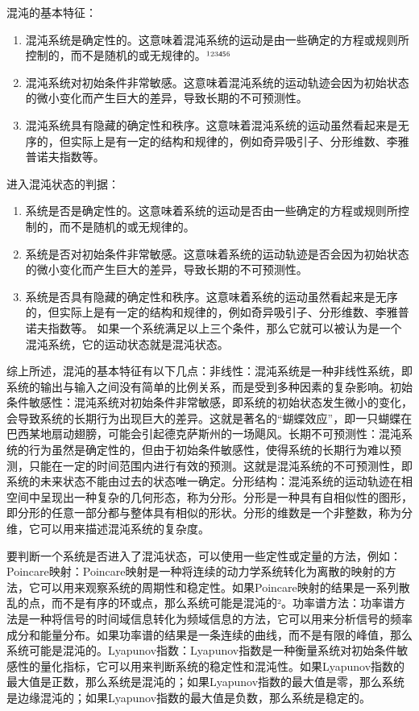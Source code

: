 \documentclass[dvipsnames, svgnames,a4paper,11pt]{article}
\begin{document}
	混沌的基本特征：
	\begin{enumerate}
		\item 混沌系统是确定性的。这意味着混沌系统的运动是由一些确定的方程或规则所控制的，而不是随机的或无规律的。¹²³⁴⁵⁶
		\item 混沌系统对初始条件非常敏感。这意味着混沌系统的运动轨迹会因为初始状态的微小变化而产生巨大的差异，导致长期的不可预测性。
		\item 混沌系统具有隐藏的确定性和秩序。这意味着混沌系统的运动虽然看起来是无序的，但实际上是有一定的结构和规律的，例如奇异吸引子、分形维数、李雅普诺夫指数等。
	\end{enumerate}
	
	进入混沌状态的判据：
	\begin{enumerate}
		\item 系统是否是确定性的。这意味着系统的运动是否由一些确定的方程或规则所控制的，而不是随机的或无规律的。
		\item 系统是否对初始条件非常敏感。这意味着系统的运动轨迹是否会因为初始状态的微小变化而产生巨大的差异，导致长期的不可预测性。
		\item 系统是否具有隐藏的确定性和秩序。这意味着系统的运动虽然看起来是无序的，但实际上是有一定的结构和规律的，例如奇异吸引子、分形维数、李雅普诺夫指数等。
		如果一个系统满足以上三个条件，那么它就可以被认为是一个混沌系统，它的运动状态就是混沌状态。
	\end{enumerate}
	
	综上所述，混沌的基本特征有以下几点：非线性：混沌系统是一种非线性系统，即系统的输出与输入之间没有简单的比例关系，而是受到多种因素的复杂影响。初始条件敏感性：混沌系统对初始条件非常敏感，即系统的初始状态发生微小的变化，会导致系统的长期行为出现巨大的差异。这就是著名的“蝴蝶效应”，即一只蝴蝶在巴西某地扇动翅膀，可能会引起德克萨斯州的一场飓风。长期不可预测性：混沌系统的行为虽然是确定性的，但由于初始条件敏感性，使得系统的长期行为难以预测，只能在一定的时间范围内进行有效的预测。这就是混沌系统的不可预测性，即系统的未来状态不能由过去的状态唯一确定。分形结构：混沌系统的运动轨迹在相空间中呈现出一种复杂的几何形态，称为分形。分形是一种具有自相似性的图形，即分形的任意一部分都与整体具有相似的形状。分形的维数是一个非整数，称为分维，它可以用来描述混沌系统的复杂度。
	
	要判断一个系统是否进入了混沌状态，可以使用一些定性或定量的方法，例如：Poincare映射：Poincare映射是一种将连续的动力学系统转化为离散的映射的方法，它可以用来观察系统的周期性和稳定性。如果Poincare映射的结果是一系列散乱的点，而不是有序的环或点，那么系统可能是混沌的²。功率谱方法：功率谱方法是一种将信号的时间域信息转化为频域信息的方法，它可以用来分析信号的频率成分和能量分布。如果功率谱的结果是一条连续的曲线，而不是有限的峰值，那么系统可能是混沌的。Lyapunov指数：Lyapunov指数是一种衡量系统对初始条件敏感性的量化指标，它可以用来判断系统的稳定性和混沌性。如果Lyapunov指数的最大值是正数，那么系统是混沌的；如果Lyapunov指数的最大值是零，那么系统是边缘混沌的；如果Lyapunov指数的最大值是负数，那么系统是稳定的。
	
\end{document}
